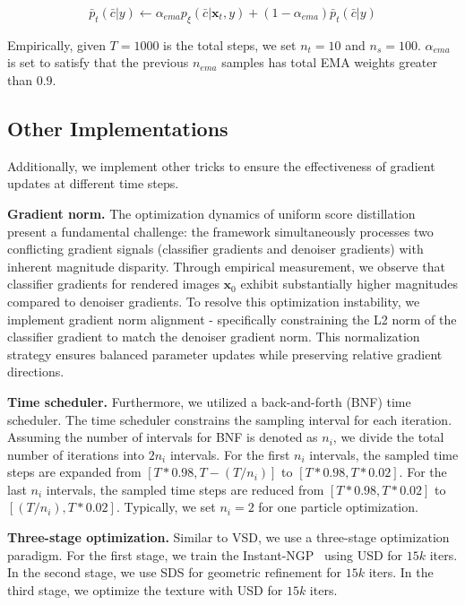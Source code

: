 \begin{equation}
 \bar{p}_t(\bar{c}|y) \leftarrow \alpha_{ema}p_{\xi}(\bar{c}|\boldsymbol{x}_t, y) + (1 - \alpha_{ema})\bar{p}_t(\bar{c}|y)
\end{equation}

Empirically, given $T=1000$ is the total steps, we set $n_t=10$ and $n_s=100$. $\alpha_{ema}$ is set to satisfy that the previous $n_{ema}$ samples has total EMA weights greater than $0.9$.






\subsection{Other Implementations}\label{app:method_others}
Additionally, we implement other tricks to ensure the effectiveness of gradient updates at different time steps.


\textbf{Gradient norm.} The optimization dynamics of uniform score distillation present a fundamental challenge: the framework simultaneously processes two conflicting gradient signals (classifier gradients and denoiser gradients) with inherent magnitude disparity. Through empirical measurement, we observe that classifier gradients for rendered images $\boldsymbol{x}_0$ exhibit substantially higher magnitudes compared to denoiser gradients. To resolve this optimization instability, we implement gradient norm alignment - specifically constraining the L2 norm of the classifier gradient to match the denoiser gradient norm. This normalization strategy ensures balanced parameter updates while preserving relative gradient directions.


\textbf{Time scheduler.} Furthermore, we utilized a back-and-forth (BNF) time scheduler. The time scheduler constrains the sampling interval for each iteration. Assuming the number of intervals for BNF is denoted as $n_i$, we divide the total number of iterations into $2n_i$ intervals. For the first $n_i$ intervals, the sampled time steps are expanded from $[T*0.98, T - (T / n_i)]$ to $[T*0.98, T*0.02]$. For the last $n_i$ intervals, the sampled time steps are reduced from $[T*0.98, T*0.02]$ to $[(T / n_i), T*0.02]$. Typically, we set $n_i=2$ for one particle optimization. 

\textbf{Three-stage optimization.} Similar to VSD, we use a three-stage optimization paradigm. For the first stage, we train the Instant-NGP~\citep{muller2022instant} using USD for $15k$ iters. In the second stage, we use SDS for geometric refinement for $15k$ iters. In the third stage, we optimize the texture with USD for $15k$ iters.


